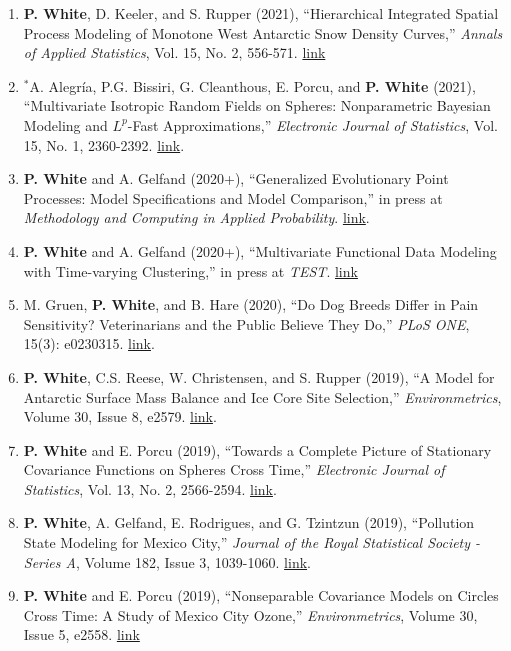 \documentclass[11pt]{article}
\begin{document}
\begin{enumerate}[label=$\bullet$]
\item \textbf{P. White}, D. Keeler, and S. Rupper (2021), ``Hierarchical Integrated Spatial Process Modeling of Monotone West Antarctic Snow Density Curves,'' \textit{Annals of Applied Statistics}, Vol. 15, No. 2, 556-571. \href{http://dx.doi.org/10.1214/21-AOAS1443}{link}

\item $^*$A. Alegr\'ia, P.G. Bissiri, G. Cleanthous, E. Porcu, and \textbf{P. White} (2021), ``Multivariate Isotropic Random  Fields on Spheres: Nonparametric Bayesian Modeling and $L^p$-Fast Approximations,'' \emph{Electronic Journal of Statistics}, Vol. 15, No. 1,  2360-2392. \href{https://doi.org/10.1214/19-EJS1593}{link}.
\item \textbf{P. White} and A. Gelfand (2020+), ``Generalized Evolutionary Point Processes: Model Specifications and Model Comparison,'' in press at  \emph{Methodology and Computing in Applied Probability}. \href{https://doi.org/10.1007/s11009-020-09797-8}{link}.
\item \textbf{P. White} and A. Gelfand (2020+), ``Multivariate Functional Data Modeling with Time-varying Clustering,'' in press at \textit{TEST}. \href{http://link.springer.com/article/10.1007/s11749-020-00733-z}{link}
\item M. Gruen, \textbf{P. White}, and B. Hare (2020), ``Do Dog Breeds Differ in Pain Sensitivity? Veterinarians and the Public Believe They Do,'' \emph{PLoS ONE}, 15(3): e0230315. \href{https://doi.org/10.1371/journal.pone.0230315}{link}.
\item \textbf{P. White}, C.S. Reese, W. Christensen, and S. Rupper (2019), ``A Model for Antarctic Surface Mass Balance and Ice Core Site Selection,'' \emph{Environmetrics}, Volume 30, Issue 8, e2579. \href{https://onlinelibrary.wiley.com/doi/abs/10.1002/env.2579}{link}.
\item \textbf{P. White} and E. Porcu (2019), ``Towards a Complete Picture of Stationary Covariance Functions on Spheres Cross Time,'' \emph{Electronic Journal of Statistics}, Vol. 13, No. 2, 2566-2594. \href{https://doi.org/10.1214/19-EJS1593}{link}.
\item \textbf{P. White}, A. Gelfand, E. Rodrigues, and G. Tzintzun (2019), ``Pollution State Modeling for Mexico City,'' \emph{Journal of the Royal Statistical Society - Series A}, Volume 182, Issue 3, 1039-1060. \href{https://rss.onlinelibrary.wiley.com/doi/abs/10.1111/rssa.12444}{link}.
\item \textbf{P. White} and E. Porcu (2019), ``Nonseparable Covariance Models on Circles Cross Time: A Study of Mexico City Ozone,'' \emph{Environmetrics}, Volume 30, Issue 5, e2558. \href{https://onlinelibrary.wiley.com/doi/full/10.1002/env.2558}{link}

\end{enumerate}
\end{document}

